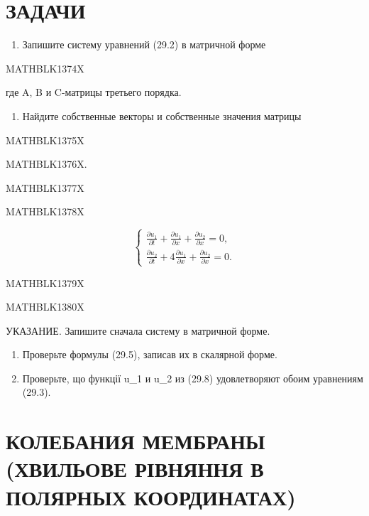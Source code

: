 \documentclass[
  ukrainian,
]{article}
\providecommand{\tightlist}{%
  \setlength{\itemsep}{0pt}\setlength{\parskip}{0pt}}
\begin{document}
\section{ЗАДАЧИ}\label{ux437ux430ux434ux430ux447ux438-4}

\begin{enumerate}
\def\labelenumi{\arabic{enumi}.}
\tightlist
\item
  Запишите систему уравнений (29.2) в матричной форме
\end{enumerate}

MATHBLK1374X

где A, B и C-матрицы третьего порядка.

\begin{enumerate}
\def\labelenumi{\arabic{enumi}.}
\setcounter{enumi}{1}
\tightlist
\item
  Найдите собственные векторы и собственные значения матрицы
\end{enumerate}

MATHBLK1375X

MATHBLK1376X.

MATHBLK1377X

MATHBLK1378X

\[
\begin{cases} \frac{\partial u_1}{\partial t} + \frac{\partial u_1}{\partial x} + \frac{\partial u_2}{\partial x} = 0, \\ \frac{\partial u_2}{\partial t} + 4 \frac{\partial u_1}{\partial x} + \frac{\partial u_2}{\partial x} = 0. \end{cases}
\]

MATHBLK1379X

MATHBLK1380X

УКАЗАНИЕ. Запишите сначала систему в матричной форме.

\begin{enumerate}
\def\labelenumi{\arabic{enumi}.}
\setcounter{enumi}{3}
\item
  Проверьте формулы (29.5), записав их в скалярной форме.
\item
  Проверьте, що функції u\_1 и u\_2 из (29.8) удовлетворяют обоим
  уравнениям (29.3).
\end{enumerate}

\section{КОЛЕБАНИЯ МЕМБРАНЫ (ХВИЛЬОВЕ РІВНЯННЯ В ПОЛЯРНЫХ
КООРДИНАТАХ)}\label{ux43aux43eux43bux435ux431ux430ux43dux438ux44f-ux43cux435ux43cux431ux440ux430ux43dux44b-ux445ux432ux438ux43bux44cux43eux432ux435-ux440ux456ux432ux43dux44fux43dux43dux44f-ux432-ux43fux43eux43bux44fux440ux43dux44bux445-ux43aux43eux43eux440ux434ux438ux43dux430ux442ux430ux445}
\end{document}
